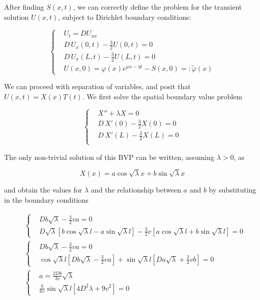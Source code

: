\documentclass[a4paper, 10pt]{article}
\begin{document}
  After finding $S(x,t)$, we can correctly define the problem for the transient
  solution $U(x,t)$, subject to Dirichlet boundary conditions:

  \begin{equation}
    \left\{ \begin{aligned}
      &U_t = D U_{xx}\\
      &D \, U_x(0, t)  - \frac{3}{2} U(0,t)  = 0\\
      &D \, U_x(L, t)  - \frac{3}{2} U(L,t)  = 0\\
      &U(x,0) = \varphi(x)e^{\mu x - \eta t} - S(x,0) =:\tilde{\varphi}(x)
    \end{aligned}\right.
  \end{equation}

  We can proceed with separation of variables, and posit that $U(x,t) =
  X(x)T(t)$. We first solve the spatial boundary value problem

  \begin{equation}
    \left\{\begin{aligned}
      &X'' + \lambda X = 0\\
      &D \, X'(0)  - \frac{3}{2} X(0)  = 0\\
      &D \, X'(L)  - \frac{3}{2} X(L)  = 0\\
    \end{aligned}\right.
  \end{equation}

  The only non-trivial solution of this BVP can be written, assuming $\lambda >
  0$, as

  \begin{equation}
    X(x) = a \cos \sqrt{\lambda} x + b \sin \sqrt{\lambda} x 
  \end{equation}

  and obtain the values for $\lambda$ and the relationship between $a$ and
  $b$ by substituting in the boundary conditions

  \begin{align}
    &\left\{\begin{aligned}
      &D b \sqrt{\lambda} - \frac{3}{2}v a = 0\\
      &D\sqrt{\lambda} \left[b \cos \sqrt{\lambda} l - a \sin \sqrt{\lambda}
      l\right] - \frac{3}{2}v \left[a\cos \sqrt{\lambda} l + b \sin
      \sqrt{\lambda}l\right] = 0
    \end{aligned}\right.\\[6pt]
    &\left\{\begin{aligned}
      &D b \sqrt{\lambda} - \frac{3}{2}v a = 0\\
      &\cos\sqrt{\lambda}l \left[Db\sqrt{\lambda} - \frac{3}{2}va\right] + \sin
      \sqrt{\lambda}l \left[Da\sqrt{\lambda} + \frac{3}{2}v b \right] = 0
    \end{aligned}\right.\\[10pt]
    &\left\{\begin{aligned}
      & a = \frac{2 D b}{3v} \sqrt{\lambda}\\
      &\frac{b}{6v} \sin \sqrt{\lambda} l \left[4D^2 \lambda + 9 v^2\right] = 0
    \end{aligned}\right.
  \end{align}
\end{document}
